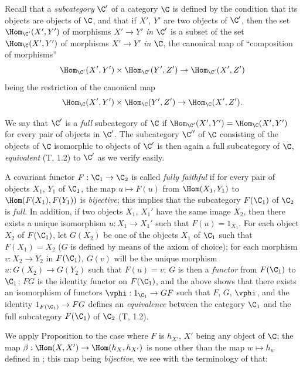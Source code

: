 \begin{env}[8.1.5]
\label{0.8.1.5}
Recall that a \emph{subcategory} $\C'$ of a category $\C$ is defined by the condition that its objects
are objects of $\C$, and that if $X'$, $Y'$ are two objects of $\C'$, then the set
$\Hom_{\C'}(X',Y')$ of morphisms $X'\to Y'$ \emph{in $\C'$} is a subset of the set $\Hom_\C(X',Y')$ of
morphisms $X'\to Y'$ \emph{in $\C$}, the canonical map of ``composition of morphisms''
\[
  \Hom_{\C'}(X',Y')\times\Hom_{\C'}(Y',Z')\to\Hom_{\C'}(X',Z')
\]
being the restriction of the canonical map
\[
  \Hom_\C(X',Y')\times\Hom_\C(Y',Z')\to\Hom_\C(X',Z').
\]

We say that $\C'$ is a \emph{full} subcategory of $\C$ if $\Hom_{\C'}(X',Y')=\Hom_\C(X',Y')$ for every
pair of objects in $\C'$. The subcategory $\C''$ of $\C$ consisting of the objects of $\C$ isomorphic to
objects of $\C'$ is then again a full subcategory of $\C$, \emph{equivalent} (T, 1.2) to $\C'$ as we
verify easily.

A covariant functor $F:\C_1\to\C_2$ is called \emph{fully faithful} if for every pair of objects
$X_1$, $Y_1$ of $\C_1$, the map $u\mapsto F(u)$ from $\Hom(X_1,Y_1)$ to $\Hom(F(X_1),F(Y_1))$ is
\emph{bijective}; this implies that the subcategory $F(\C_1)$ of $\C_2$ is \emph{full}. In addition,
if two objects $X_1$, $X_1'$ have the same image $X_2$, then there exists a unique isomorphism
$u:X_1\to X_1'$ such that $F(u)=1_{X_1}$. For each object $X_2$ of $F(\C_1)$, let $G(X_2)$ be one of
the objects $X_1$ of $\C_1$ such that $F(X_1)=X_2$ ($G$ is defined by means of the axiom of choice); for
each morphism $v:X_2\to Y_2$ in $F(\C_1)$, $G(v)$ will be the unique morphism $u:G(X_2)\to G(Y_2)$ such
that $F(u)=v$; $G$ is then a \emph{functor} from $F(\C_1)$ to $\C_1$; $FG$ is the identity functor on
$F(\C_1)$, and the above shows that there exists an isomorphism of functors $\vphi:1_{\C_1}\to GF$
such that $F$, $G$, $\vphi$, and the identity $1_{F(\C_1)}\to FG$ defines an \emph{equivalence} between
the category $\C_1$ and the full subcategory $F(\C_1)$ of $\C_2$ (T, 1.2).
\end{env}

\begin{env}[8.1.6]
\label{0.8.1.6}
We apply Proposition  to the case where $F$ is $h_{X'}$, $X'$ being any
object of $\C$; the map $\beta:\Hom(X,X')\to\Hom(h_X,h_{X'})$ is none other than the map
$w\mapsto h_w$ defined in ; this map being \emph{bijective}, we see
with the terminology of  that:
\end{env}

